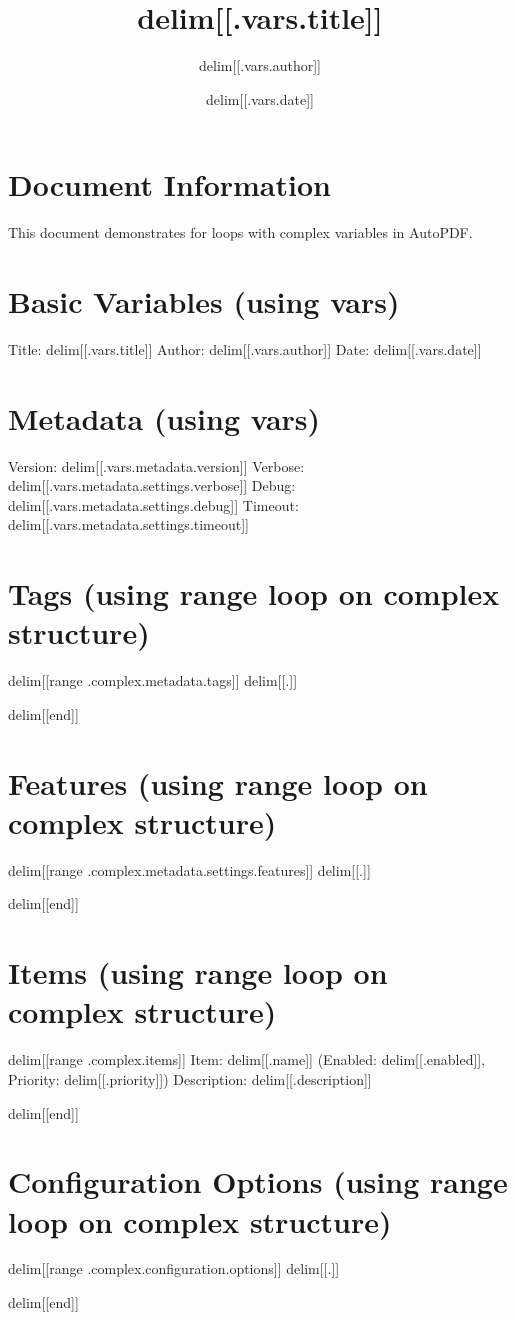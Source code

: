 \documentclass{article}
\title{delim[[.vars.title]]}
\author{delim[[.vars.author]]}
\date{delim[[.vars.date]]}
\begin{document}
\maketitle

\section{Document Information}
This document demonstrates for loops with complex variables in AutoPDF.

\section{Basic Variables (using vars)}
Title: delim[[.vars.title]]
Author: delim[[.vars.author]]
Date: delim[[.vars.date]]

\section{Metadata (using vars)}
Version: delim[[.vars.metadata.version]]
Verbose: delim[[.vars.metadata.settings.verbose]]
Debug: delim[[.vars.metadata.settings.debug]]
Timeout: delim[[.vars.metadata.settings.timeout]]

\section{Tags (using range loop on complex structure)}
delim[[range .complex.metadata.tags]]
delim[[.]]\par
delim[[end]]

\section{Features (using range loop on complex structure)}
delim[[range .complex.metadata.settings.features]]
delim[[.]]\par
delim[[end]]

\section{Items (using range loop on complex structure)}
delim[[range .complex.items]]
Item: delim[[.name]] (Enabled: delim[[.enabled]], Priority: delim[[.priority]])
Description: delim[[.description]]\par
delim[[end]]

\section{Configuration Options (using range loop on complex structure)}
delim[[range .complex.configuration.options]]
delim[[.]]\par
delim[[end]]
\end{document}
